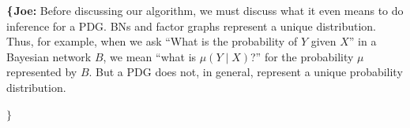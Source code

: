 \documentclass[twoside]{article}
\newcommand\vjoe[1]{{\color{joecolor}\textbf{$\boldsymbol\{$Joe: }#1 \textbf{$\boldsymbol\}$}}}
\begin{document}
\vjoe{
Before discussing our algorithm, we must discuss what it even means to do inference for a PDG.  BNs and factor graphs represent a unique distribution. 
Thus, for example, when we ask ``What is the probability of $Y$ given $X$''
in a Bayesian network $B$, we mean ``what is $\mu(Y \mid X)$?'' for the probability $\mu$ represented by $B$.
But a PDG does not, in general, represent a unique probability distribution.

}
\end{document}
